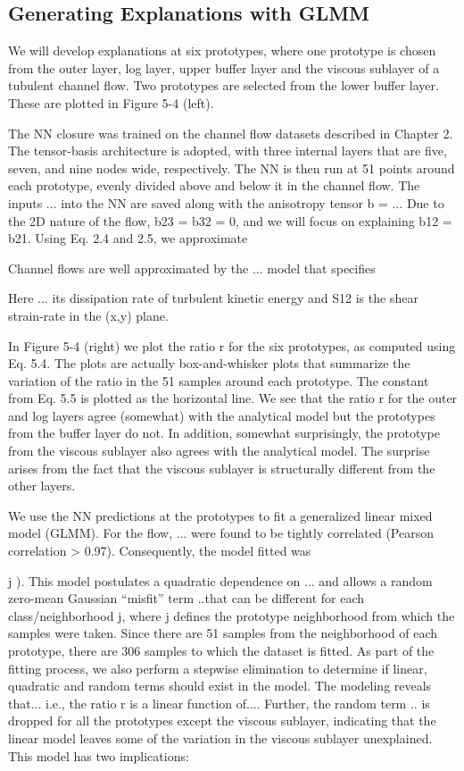 \subsection{Generating Explanations with GLMM}

We will develop explanations at six prototypes, where one prototype is chosen from the outer layer, log
layer, upper buffer layer and the viscous sublayer of a tubulent channel ﬂow. Two prototypes are selected
from the lower buffer layer. These are plotted in Figure 5-4 (left).

The NN closure was trained on the channel ﬂow datasets described in Chapter 2. The tensor-basis
architecture is adopted, with three internal layers that are ﬁve, seven, and nine nodes wide, respectively.
The NN is then run at 51 points around each prototype, evenly divided above and below it in the channel
ﬂow. The inputs ... into the NN are saved along with the anisotropy tensor
b = ... Due to the 2D nature of the ﬂow, b23 = b32 = 0, and we will focus on
explaining b12 = b21.
Using Eq. 2.4 and 2.5, we approximate



Channel ﬂows are well approximated by the ... model that speciﬁes


Here ... its dissipation rate of turbulent kinetic energy and S12 is the shear strain-rate in the (x,y) plane.



In Figure 5-4 (right) we plot the ratio r for the six prototypes, as computed using Eq. 5.4. The plots are
actually box-and-whisker plots that summarize the variation of the ratio in the 51 samples around each
prototype. The constant from Eq. 5.5 is plotted as the horizontal line. We see that the ratio r for the outer
and log layers agree (somewhat) with the analytical model but the prototypes from the buffer layer do not.
In addition, somewhat surprisingly, the prototype from the viscous sublayer also agrees with the analytical
model. The surprise arises from the fact that the viscous sublayer is structurally different from the other
layers.

We use the NN predictions at the prototypes to ﬁt a generalized linear mixed model (GLMM). For the ﬂow,
... were found to be tightly correlated (Pearson correlation > 0.97).
Consequently, the model ﬁtted was


j ). This model postulates a quadratic dependence on ... and allows a random zero-mean
Gaussian “misﬁt” term ..that can be different for each class/neighborhood j, where j deﬁnes the prototype
neighborhood from which the samples were taken. Since there are 51 samples from the neighborhood of
each prototype, there are 306 samples to which the dataset is ﬁtted. As part of the ﬁtting process, we also
perform a stepwise elimination to determine if linear, quadratic and random terms should exist in the
model.
The modeling reveals that... i.e., the ratio r is a linear function of.... Further, the random
term .. is dropped for all the prototypes except the viscous sublayer, indicating that the linear model leaves
some of the variation in the viscous sublayer unexplained. This model has two implications:


